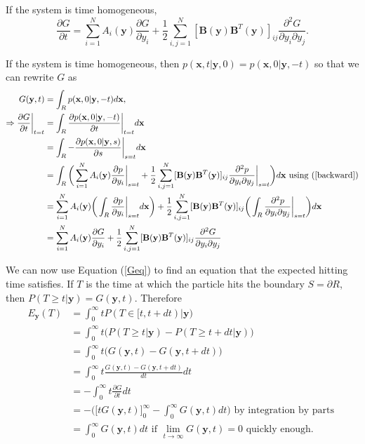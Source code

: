 \documentclass{article}
\newcommand{\mb}{\mathbf}
\begin{document}
\begin{claim} If the system is time homogeneous,
\begin{equation}
\frac{\partial G}{\partial t}=\sum_{i=1}^NA_i({\mb y})\frac{\partial G}{\partial y_i}+\frac{1}{2}\sum_{i,j=1}^N[{\mb B}({\mb y}){\mb B}^T({\mb y})]_{ij}\frac{\partial^2 G}{\partial y_i\partial y_j}. \label{Geq}
\end{equation}
\end{claim}
\begin{pf}
If the system is time homogeneous, then $p({\mb x},t|{\mb y},0)=p({\mb x},0|{\mb y},-t)$ so that we can rewrite $G$ as 
\begin{align*}
G({\mb y},t)&=\int_Rp({\mb x},0|{\mb y},-t)d{\mb x},
\\\Rightarrow \frac{\partial G}{\partial t}\bigg|_{t=t}&=\int_R\frac{\partial p({\mb x},0|{\mb y},-t)}{\partial t}\bigg|_{t=t}d{\mb x}
\\&=\int_R -\frac{\partial p({\mb x},0|{\mb y},s)}{\partial s}\bigg|_{s=t} d{\mb x}
\\&=\int_R\bigg(\sum_{i=1}^NA_i({\mb y})\frac{\partial p}{\partial y_{i}}\bigg|_{s=t}+\frac{1}{2}\sum_{i,j=1}^N[{\mb B}({\mb y}){\mb B}^T({\mb y})]_{ij}\frac{\partial^2 p}{\partial y_{i}\partial y_{j}}\bigg|_{s=t}\bigg) d{\mb x} \text{ using (\ref{backward})}
\\&=\sum_{i=1}^NA_i({\mb y})\bigg(\int_R\frac{\partial p}{\partial y_{i}}\bigg|_{s=t}d{\mb x}\bigg)+\frac{1}{2}\sum_{i,j=1}^N[{\mb B}({\mb y}){\mb B}^T({\mb y})]_{ij}\bigg(\int_R\frac{\partial^2 p}{\partial y_{i}\partial y_{j}}\bigg|_{s=t}\bigg) d{\mb x}
\\&=\sum_{i=1}^NA_i({\mb y})\frac{\partial G}{\partial y_i}+\frac{1}{2}\sum_{i,j=1}^N[{\mb B}({\mb y}){\mb B}^T({\mb y})]_{ij}\frac{\partial^2 G}{\partial y_i\partial y_j}
\end{align*}
\end{pf}

We can now use Equation (\ref{Geq}) to find an equation that the expected hitting time satisfies. If $T$ is the time at which the particle hits the boundary $S=\partial R$, then $P(T\geq t|{\mb y})=G({\mathbf y},t)$.  Therefore
\begin{align*}
E_{{\mathbf y}}(T) &=\int_0^\infty t P(T\in[t,t+dt)|{\mathbf y})
\\&= \int_0^\infty t \bigg(P(T\geq t|{\mathbf y})-P(T\geq t+dt|{\mathbf y})\bigg) 
\\&=\int_0^\infty t \bigg(G({\mathbf y},t)-G({\mathbf y},t+dt)\bigg)
\\&=\int_0^\infty t \frac{G({\mathbf y},t)-G({\mathbf y},t+dt)}{dt}dt
\\&=-\int_0^\infty t\frac{\partial G}{\partial t}dt
\\&=-\bigg(\big[tG({\mathbf y},t)\big]_0^{\infty}-\int_0^\infty G({\mathbf y},t)dt\bigg)  \text{ by integration by parts }
\\&=\int_0^\infty G({\mathbf y},t)dt \text{ if $\lim_{t\to \infty}G({\mathbf y},t)=0$ quickly enough}.
\end{align*}
\end{document}
